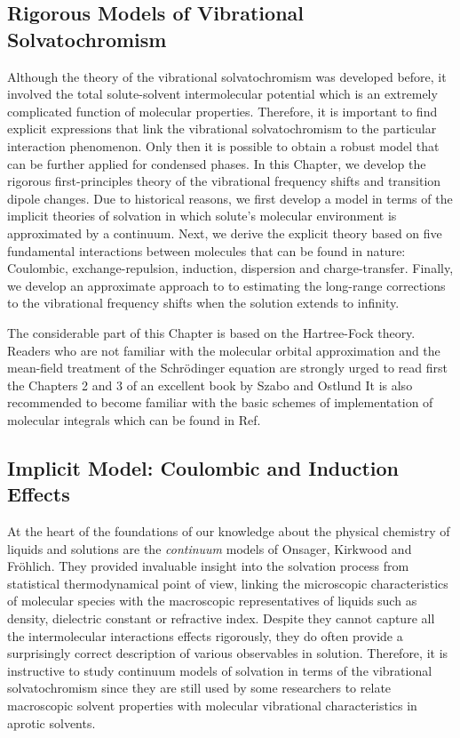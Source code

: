 \documentclass[b5paper,oneside,fleqn,11pt]{book}
\begin{document}
\begin{refsection}
\chapter{Rigorous Models of Vibrational Solvatochromism \label{c:my-model}}

Although the theory of the vibrational solvatochromism
was developed before, it involved the total solute\hyp{}solvent
intermolecular potential which is an extremely complicated function
of molecular properties.
Therefore, it is important to find explicit 
expressions that link the vibrational solvatochromism
to the particular interaction phenomenon.
Only then it is possible to obtain a robust model
that can be further applied for condensed phases. 
In this Chapter, we develop the rigorous first\hyp{}principles
theory of the vibrational frequency shifts and transition
dipole changes.
Due to historical reasons, we first develop a model in terms
of the implicit theories of solvation in which solute's molecular
environment is approximated by a continuum. 
Next, we derive the explicit theory based on five fundamental interactions
between molecules that can be found in nature: Coulombic, 
exchange\hyp{}repulsion, induction, dispersion and charge\hyp{}transfer.
Finally, we develop an approximate approach to
to estimating the long\hyp{}range corrections to the vibrational
frequency shifts when the solution extends to infinity. 

The considerable
part of this Chapter is based on the Hartree\hyp{}Fock theory. \citep{Roothaan.RevModPhys.1951}
Readers who
are not familiar with the molecular orbital approximation and the mean\hyp{}field
treatment of the Schr{\"o}dinger equation are strongly urged to read first the
Chapters 2 and 3 of an excellent book by Szabo and Ostlund \citep{Szabo.Ostlund.ModernQuantumChemistry.1996}
It is also recommended to become familiar with the basic schemes of implementation of molecular
integrals which can be found in Ref. \citep{Cook.HandbookOfComputationalQuantumChemistry.2005}

\section{Implicit Model: Coulombic and Induction Effects\label{s:implicit-model}}

At the heart of the foundations of our knowledge about the 
physical chemistry of liquids and solutions are the \emph{continuum}
models of Onsager, Kirkwood and Fr{\"o}hlich. They
provided invaluable insight into the solvation
process from statistical thermodynamical point of view, linking
the microscopic characteristics of molecular species
with the macroscopic representatives of liquids
such as density, dielectric constant or refractive index.
Despite they cannot capture all the intermolecular
interactions effects rigorously, they do often provide a surprisingly 
correct
description of various observables in solution.
Therefore, it is instructive to study continuum models of solvation
in terms of the vibrational solvatochromism since they 
are still used by some researchers to relate macroscopic
solvent properties with molecular vibrational characteristics
in aprotic solvents.


\end{refsection}
\end{document}
